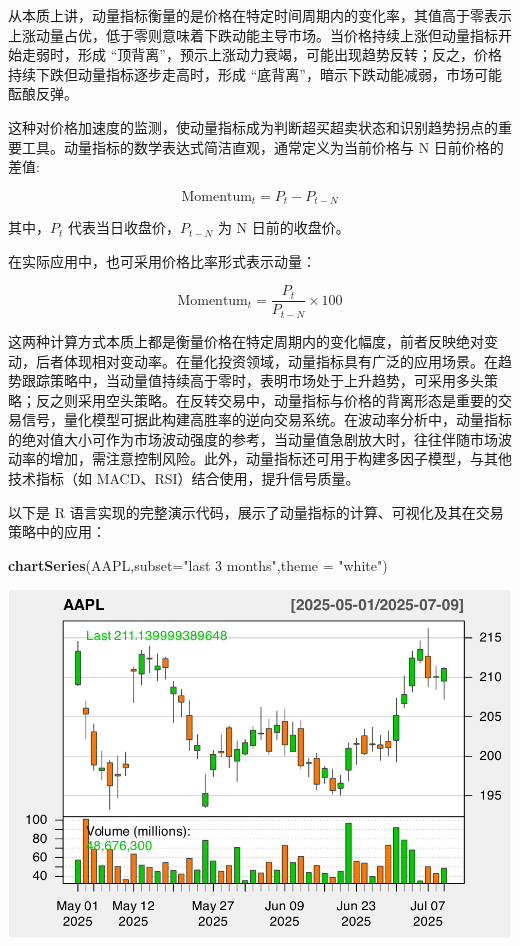 \documentclass[]{ctexbook}
\newenvironment{Shaded}{\begin{snugshade}}{\end{snugshade}}
\newcommand{\AttributeTok}[1]{\textcolor[rgb]{0.13,0.29,0.53}{#1}}
\newcommand{\FunctionTok}[1]{\textcolor[rgb]{0.13,0.29,0.53}{\textbf{#1}}}
\newcommand{\NormalTok}[1]{#1}
\newcommand{\StringTok}[1]{\textcolor[rgb]{0.31,0.60,0.02}{#1}}
\begin{document}
从本质上讲，动量指标衡量的是价格在特定时间周期内的变化率，其值高于零表示上涨动量占优，低于零则意味着下跌动能主导市场。当价格持续上涨但动量指标开始走弱时，形成 ``顶背离''，预示上涨动力衰竭，可能出现趋势反转；反之，价格持续下跌但动量指标逐步走高时，形成 ``底背离''，暗示下跌动能减弱，市场可能酝酿反弹。

这种对价格加速度的监测，使动量指标成为判断超买超卖状态和识别趋势拐点的重要工具。动量指标的数学表达式简洁直观，通常定义为当前价格与 N 日前价格的差值:

\[\text{Momentum}_t = P_t - P_{t-N}\]

其中，\(P_t\) 代表当日收盘价，\(P_{t-N}\) 为 N 日前的收盘价。

在实际应用中，也可采用价格比率形式表示动量：

\[
\text{Momentum}_t = \frac{P_t}{P_{t-N}} \times 100
\]

这两种计算方式本质上都是衡量价格在特定周期内的变化幅度，前者反映绝对变动，后者体现相对变动率。在量化投资领域，动量指标具有广泛的应用场景。在趋势跟踪策略中，当动量值持续高于零时，表明市场处于上升趋势，可采用多头策略；反之则采用空头策略。在反转交易中，动量指标与价格的背离形态是重要的交易信号，量化模型可据此构建高胜率的逆向交易系统。在波动率分析中，动量指标的绝对值大小可作为市场波动强度的参考，当动量值急剧放大时，往往伴随市场波动率的增加，需注意控制风险。此外，动量指标还可用于构建多因子模型，与其他技术指标（如 MACD、RSI）结合使用，提升信号质量。

以下是 R 语言实现的完整演示代码，展示了动量指标的计算、可视化及其在交易策略中的应用：

\begin{Shaded}
\begin{Highlighting}[]
\FunctionTok{chartSeries}\NormalTok{(AAPL,}\AttributeTok{subset=}\StringTok{"last 3 months"}\NormalTok{,}\AttributeTok{theme =} \StringTok{"white"}\NormalTok{)}
\end{Highlighting}
\end{Shaded}

\includegraphics[width=0.9\linewidth]{quantmod_files/figure-latex/mom-1}
\end{document}
